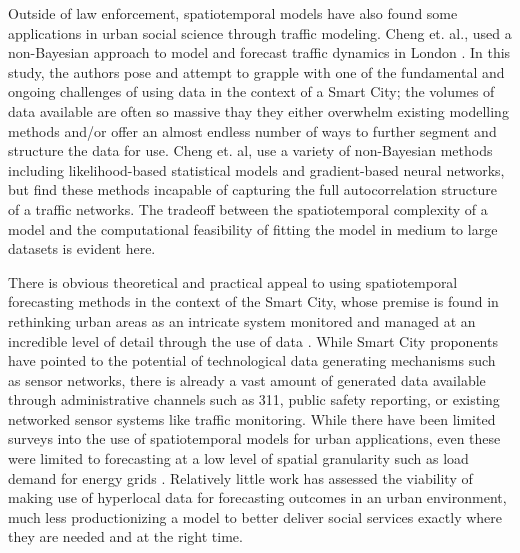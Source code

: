 \documentclass{article}
\begin{document}
Outside of law enforcement, spatiotemporal models have also found some applications in urban social science through traffic modeling. Cheng et. al., used a non-Bayesian approach to model and forecast traffic dynamics in London \cite{cheng_2012}. In this study, the authors pose and attempt to grapple with one of the fundamental and ongoing challenges of using data in the context of a Smart City; the volumes of data available are often so massive thay they either overwhelm existing modelling methods and/or offer an almost endless number of ways to further segment and structure the data for use. Cheng et. al, use a variety of non-Bayesian methods including likelihood-based statistical models and gradient-based neural networks, but find these methods incapable of capturing the full autocorrelation structure of a traffic networks. The tradeoff between the spatiotemporal complexity of a model and the computational feasibility of fitting the model in medium to large datasets is evident here. \par

There is obvious theoretical and practical appeal to using spatiotemporal forecasting methods in the context of the Smart City, whose premise is found in rethinking urban areas as an intricate system monitored and managed at an incredible level of detail through the use of data \cite{kitchin_2014}. While Smart City proponents have pointed to the potential of technological data generating mechanisms such as sensor networks, there is already a vast amount of generated data available through administrative channels such as 311, public safety reporting, or existing networked sensor systems like traffic monitoring. While there have been limited surveys into the use of spatiotemporal models for urban applications, even these were limited to forecasting at a low level of spatial granularity such as load demand for energy grids \cite{tascikaraoglu_2017}. Relatively little work has assessed the viability of making use of hyperlocal data for forecasting outcomes in an urban environment, much less productionizing a model to better deliver social services exactly where they are needed and at the right time.




\end{document}
